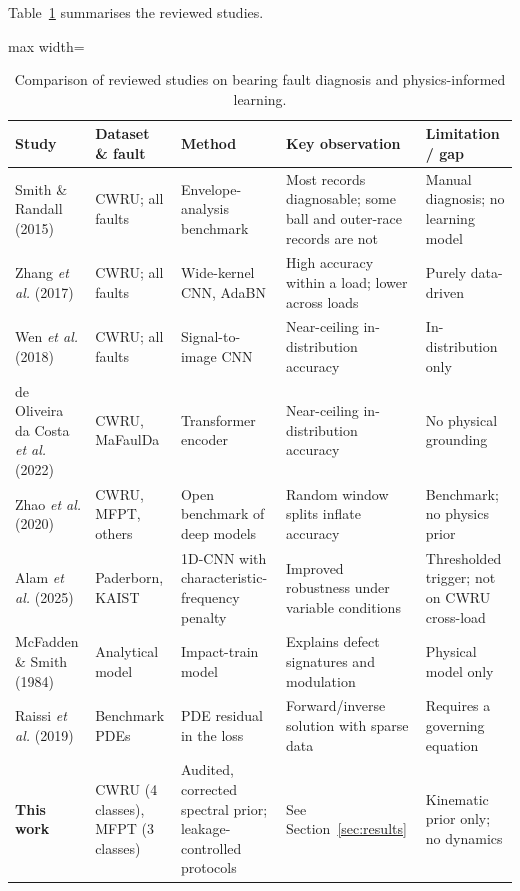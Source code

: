 \documentclass[conference]{IEEEtran}
\begin{document}
Table~\ref{tab:related} summarises the reviewed studies.

\begin{table}[t]
\caption{Comparison of reviewed studies on bearing fault diagnosis and
physics-informed learning.}
\label{tab:related}
\centering
\footnotesize
\begin{adjustbox}{max width=\textwidth}
\begin{tabular}{p{2.5cm} p{2.4cm} p{3.2cm} p{4.0cm} p{3.2cm}}
\toprule
\textbf{Study} & \textbf{Dataset \& fault} & \textbf{Method} & \textbf{Key observation} & \textbf{Limitation / gap} \\
\midrule
Smith \& Randall (2015)~\cite{smith2015} & CWRU; all faults & Envelope-analysis benchmark & Most records diagnosable; some ball and outer-race records are not & Manual diagnosis; no learning model \\
Zhang \emph{et al.} (2017)~\cite{zhang2017} & CWRU; all faults & Wide-kernel CNN, AdaBN & High accuracy within a load; lower across loads & Purely data-driven \\
Wen \emph{et al.} (2018)~\cite{wen2018} & CWRU; all faults & Signal-to-image CNN & Near-ceiling in-distribution accuracy & In-distribution only \\
de Oliveira da Costa \emph{et al.} (2022)~\cite{costa2022} & CWRU, MaFaulDa & Transformer encoder & Near-ceiling in-distribution accuracy & No physical grounding \\
Zhao \emph{et al.} (2020)~\cite{zhao2020} & CWRU, MFPT, others & Open benchmark of deep models & Random window splits inflate accuracy & Benchmark; no physics prior \\
Alam \emph{et al.} (2025)~\cite{alam2025} & Paderborn, KAIST & 1D-CNN with characteristic-frequency penalty & Improved robustness under variable conditions & Thresholded trigger; not on CWRU cross-load \\
McFadden \& Smith (1984)~\cite{mcfadden1984} & Analytical model & Impact-train model & Explains defect signatures and modulation & Physical model only \\
Raissi \emph{et al.} (2019)~\cite{raissi2019} & Benchmark PDEs & PDE residual in the loss & Forward/inverse solution with sparse data & Requires a governing equation \\
\textbf{This work} & CWRU (4 classes), MFPT (3 classes) & Audited, corrected spectral prior; leakage-controlled protocols & See Section~\ref{sec:results} & Kinematic prior only; no dynamics \\
\bottomrule
\end{tabular}
\end{adjustbox}
\end{table}
\end{document}
